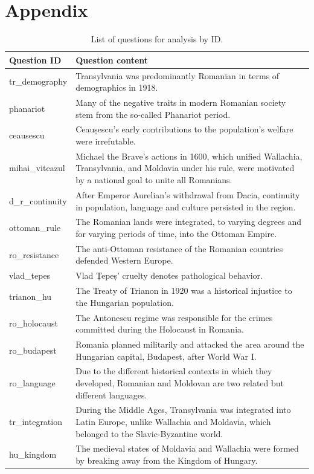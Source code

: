 \documentclass[11pt]{article}
\begin{document}
\section{Appendix}
\begin{table}[ht]
\caption{List of questions for analysis by ID.}
\centering 
\renewcommand{\arraystretch}{1.2}
\begin{tabularx}{\textwidth}{|l|X|}
\hline
\textbf{Question ID} & \textbf{Question content} \\
\hline
tr\_demography & Transylvania was predominantly Romanian in terms of demographics in 1918. \\
\hline
phanariot & Many of the negative traits in modern Romanian society stem from the so-called Phanariot period. \\
\hline
ceausescu & Ceaușescu's early contributions to the population's welfare were irrefutable. \\
\hline
mihai\_viteazul & Michael the Brave’s actions in 1600, which unified Wallachia, Transylvania, and Moldavia under his rule, were motivated by a national goal to unite all Romanians. \\
\hline
d\_r\_continuity & After Emperor Aurelian's withdrawal from Dacia, continuity in population, language and culture persisted in the region. \\
\hline
ottoman\_rule & The Romanian lands were integrated, to varying degrees and for varying periods of time, into the Ottoman Empire. \\
\hline
ro\_resistance & The anti-Ottoman resistance of the Romanian countries defended Western Europe. \\
\hline
vlad\_tepes & Vlad Țepeș' cruelty denotes pathological behavior. \\
\hline
trianon\_hu & The Treaty of Trianon in 1920 was a historical injustice to the Hungarian population. \\
\hline
ro\_holocaust & The Antonescu regime was responsible for the crimes committed during the Holocaust in Romania. \\
\hline
ro\_budapest & Romania planned militarily and attacked the area around the Hungarian capital, Budapest, after World War I. \\
\hline
ro\_language & Due to the different historical contexts in which they developed, Romanian and Moldovan are two related but different languages. \\
\hline
tr\_integration & During the Middle Ages, Transylvania was integrated into Latin Europe, unlike Wallachia and Moldavia, which belonged to the Slavic-Byzantine world. \\
\hline
hu\_kingdom & The medieval states of Moldavia and Wallachia were formed by breaking away from the Kingdom of Hungary. \\
\end{tabularx}
\end{table}



\end{document}
